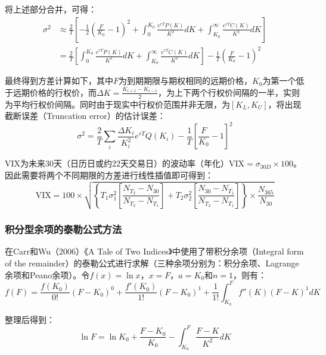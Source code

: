 \documentclass[11pt]{article}
\begin{document}
将上述部分合并，可得：
\begin{align*}
    \sigma^2 &\approx \frac{2}{T} \left[ - \frac{1}{2} \left( \frac{F}{K_0} -1 \right)^2 + \int^{K_0}_{0} \frac{e^{rT}P(K)}{K^2} dK + \int^{\infty}_{K_0} \frac{e^{rT}C(K)}{K^2} dK \right] \\
    &= \frac{2}{T} \left[ \int^{K_0}_{0} \frac{e^{rT}P(K)}{K^2} dK + \int^{\infty}_{K_0} \frac{e^{rT}C(K)}{K^2} dK \right] - \frac{1}{T} \left( \frac{F}{K_0} -1 \right)^2
\end{align*}

最终得到方差计算如下，其中$F$为到期期限与期权相同的远期价格，$K_0$为第一个低于远期价格的行权价，而$\Delta K = \tfrac{K_{i+1}-K_{i-1}}{2}$，为上下两个行权价间隔的一半，实则为平均行权价间隔。同时由于现实中行权价范围并非无限，为$[K_L,K_U]$，将出现截断误差（Truncation error）的估计误差：
\begin{equation*}
    \boxed{
        \sigma^2 = \frac{2}{T} \sum_{i} \frac{\Delta K_i}{K_i^2} e^{rT} Q(K_i) - \frac{1}{T} \left[\frac{F}{K_0} - 1\right]^2 
    }
\end{equation*}

VIX为未来30天（日历日或约22天交易日）的波动率（年化）$\text{VIX}=\sigma_{30D} \times 100$。因此需要将两个不同期限的方差进行线性插值即可得到：
\begin{equation*}
    \text{VIX} = 100 \times \sqrt{ \left\{ T_1 \sigma^2_1 \left[ \frac{N_{T_2} - N_{30}}{N_{T_2}-N_{T_1}}\right] + T_2 \sigma^2_2 \left[ \frac{N_{30} - N_{T_1}}{N_{T_2}-N_{T_1}}\right] \right\}\times \frac{N_{365}}{N_{30}} }
\end{equation*}

\subsubsection{积分型余项的泰勒公式方法}
在Carr和Wu（2006）《A Tale of Two Indices》中使用了带积分余项（Integral form of the remainder）的泰勒公式进行求解（三种余项分别为：积分余项、Lagrange余项和Peano余项）。令$f(x) = \ln x$，$x=F$，$a=K_0$和$n=1$，则有：
\begin{equation*}
    f(F) = \frac{f(K_0)}{0!}(F-K_0)^0 + \frac{f'(K_0)}{1!}(F-K_0)^1 + \frac{1}{1!} \int^{F}_{K_0} f''(K) (F - K)^1 dK
\end{equation*}

整理后得到：
\begin{equation*}
    \ln F = \ln K_0 + \frac{F - K_0}{K_0} - \int^{F}_{K_0} \frac{F-K}{K^2} dK
\end{equation*}
\end{document}
